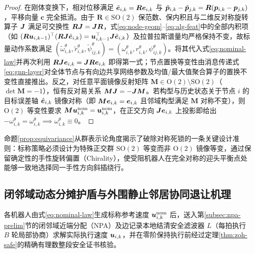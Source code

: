 \begin{proof}
在刚体变换下，相对位移满足 $\tilde{\boldsymbol{e}}_{i,k}=\boldsymbol R\boldsymbol{e}_{i,k}$ 与 $\tilde{\boldsymbol{p}}_{i,k}-\tilde{\boldsymbol{p}}_{j,k}=\boldsymbol R(\boldsymbol{p}_{i,k}-\boldsymbol{p}_{j,k})$，平移向量 $\boldsymbol c$ 完全抵消。由于 $\boldsymbol R\in\mathrm{SO}(2)$ 保范数、保内积且与二维反对称旋转算子 $\boldsymbol{J}$ 满足可交换性 $\boldsymbol R\boldsymbol{J}=\boldsymbol{J}\boldsymbol R$，式\eqref{eq:node-geom}--\eqref{eq:alg-feat}中的全部内积项（如 $(\boldsymbol R\boldsymbol{u}_{i,k-1})^{\top}(\boldsymbol R\boldsymbol{J}\hat{\boldsymbol{e}}_{i,k})=\boldsymbol{u}_{i,k-1}^{\top}\boldsymbol{J}\hat{\boldsymbol{e}}_{i,k}$）及拉普拉斯谱量均严格保持不变，故标量动作系数满足 $(\tilde\omega_{i,k}^\theta,\tilde r_{i,k}^\theta,\tilde\psi_{ij,k}^\theta)=(\omega_{i,k}^\theta,r_{i,k}^\theta,\psi_{ij,k}^\theta)$。将其代入式\eqref{eq:nominal-law}并再次利用 $\boldsymbol R\boldsymbol{J}\boldsymbol{e}_{i,k}=\boldsymbol{J}\boldsymbol R\boldsymbol{e}_{i,k}$ 即得第一式；节点置换等变性由消息传递式\eqref{eq:gnn-layer}对全体节点与有向边共享网络参数及均值/最大值聚合算子的置换不变性直接推出。反之，对任意平面镜像反射矩阵 $\boldsymbol M\in\mathrm{O}(2)\setminus\mathrm{SO}(2)$（$\det\boldsymbol M=-1$），恒有反对易关系 $\boldsymbol M\boldsymbol{J}=-\boldsymbol{J}\boldsymbol M$。若构型与历史状态关于节点 $i$ 的目标误差轴 $\hat{\boldsymbol{e}}_{i,k}$ 镜像对称（即 $\boldsymbol M\boldsymbol{e}_{i,k}=\boldsymbol{e}_{i,k}$ 且邻域构型满足 $\boldsymbol M$ 对称不变），则 $\mathrm{O}(2)$ 等变性要求 $\boldsymbol M\boldsymbol{u}_{i,k}^{\mathrm{nom}}=\boldsymbol{u}_{i,k}^{\mathrm{nom}}$，在正交方向 $\boldsymbol{J}\boldsymbol{e}_{i,k}$ 上投影即给出 $-\omega_{i,k}^\theta=\omega_{i,k}^\theta\implies\omega_{i,k}^\theta\equiv 0$。
\end{proof}

命题\ref{prop:equivariance}从群表示论角度揭示了破除对称死锁的一条关键设计准则：标称策略必须设计为特殊正交群 $\mathrm{SO}(2)$ 等变而非 $\mathrm{O}(2)$ 镜像等变，通过保留确定性的手性旋转偏置（Chirality），使受阻机器人在完全对称的迎头平衡点处能够一致地选择同一手性方向斜插绕行。

\subsection{闭邻域动态分摊护盾与外围静止邻居协同退让机理}\label{subsec:npa-yield}
各机器人由式\eqref{eq:nominal-law}生成标称参考速度 $\boldsymbol{u}_{i,k}^{\mathrm{nom}}$ 后，送入第\ref{subsec:npa-prelim}节的闭邻域近端分配（NPA）及边记录本地结清安全滤波器 $L$（每拍执行 $B$ 轮局部协商）求解实际执行速度 $\boldsymbol{u}_{i,k}$，并在零阶保持执行前经过定理\ref{thm:zoh-safe}的精确有理数整段安全证书核验。

